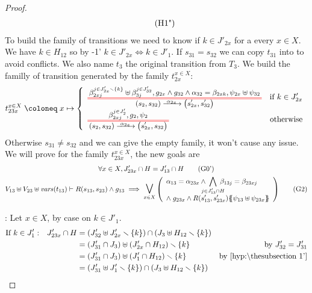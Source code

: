 \documentclass{article}
\begin{document}
\begin{proof}
\begin{gather*}
{\begin{array}{l}
		\end{array}} \hyp{1"}
	\end{gather*}
	To build the family of transitions we need to know if \(k \in J'_{2x}\) for a every \(x \in X\).
	We have \(k \in H_{12}\) so by \hyp{1'} \(k \in J'_{2x} \iff k \in J'_1\).
	If \(s_{31} = s_{32}\) we can copy \(t_{31}\) into  to avoid conflicts.
	We also name \(t_3\) the original transition from \(T_3\).
	We build the familly of transition generated by the family \(t_{2x}^{x \in X}\):
	\[ t_{23x}^{x \in X} \defobject x \mapsto \choice{
		\OT{\mpar{s_2, s_{32}}}{\mpar{s'_{2x}, s'_{32}}}{\alpha_{2x}}{\beta_{2xj}^{j \in J'_{2x} \setminus \mbrc{k}} \uplus \beta_{3j}^{j \in J'_{32}}}{g_{2x} \wedge g_{32} \wedge \alpha_{32} = \beta_{2xk}}{\psi_{2x} \uplus \psi_{32}} & \text{if } k \in J'_{2x} \\
		\OT{\mpar{s_2, s_{32}}}{\mpar{s'_{2x}, s_{32}}}{\alpha_{2x}}{\beta_{2xj}^{j \in J'_2}}{g_2}{\psi_2} & \text{otherwise}
	} \]
	Otherwise \(s_{31} \neq s_{32}\) and we can give the empty family, it won't cause any issue.
	We will prove  for the family \(t_{23x}^{x \in X}\), the new goals are
	\begin{gather}
		\forall x \in X, J'_{23x} \cap H = J'_{13} \cap H \goal{0'} \\
		V_{13} \uplus V_{23} \uplus \fvars{t_{13}} \vdash R\mpar{s_{13}, s_{23}} \wedge g_{13} \implies \operatorname*{\bigsymb{\bigvee}}_{x \in X} \mpar{\everymath{\displaystyle}\begin{array}{l}
			\alpha_{13} = \alpha_{23x} \wedge \bigwedge_\subbox{j \in J'_{13} \cap H} \beta_{13j} = \beta_{23xj} \\[12pt]
			\nwedge g_{23x} \wedge R\mpar{s'_{13}, s'_{23x}}\psubst{\psi_{13} \uplus \psi_{23x}}
		\end{array}} \goal{2}
	\end{gather}
\item[\goal{0'}:] Let \(x \in X\), by case on \(k \in J'_1\).
	\begin{align*}
		\text{If } k \in J'_1: && J'_{23x} \cap H & = \mpar{J'_{32} \uplus J'_{2x} \setminus \mbrc{k}} \cap \mpar{J_3 \uplus H_{12} \setminus \mbrc{k}} \\
		&&& = \mpar{J'_{31} \cap J_3} \uplus \mpar{J'_{2x} \cap H_{12}} \setminus \mbrc{k} & \text{by } J'_{32} = J'_{31} \\
		&&& = \mpar{J'_{31} \cap J_3} \uplus \mpar{J'_1 \cap H_{12}} \setminus \mbrc{k} & \text{by \hyp{1'}} \\
		&&& = \mpar{J'_{31} \uplus J'_1 \setminus \mbrc{k}} \cap \mpar{J_3 \uplus H_{12} \setminus \mbrc{k}} \\

\end{align*}
\end{proof}
\end{document}

